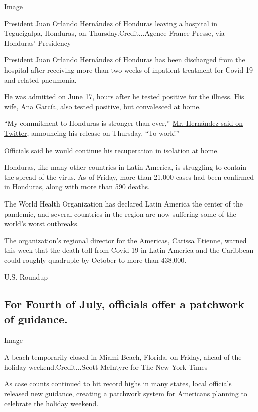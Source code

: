 Image

President Juan Orlando Hernández of Honduras leaving a hospital in
Tegucigalpa, Honduras, on Thursday.Credit...Agence France-Presse, via
Honduras' Presidency

President Juan Orlando Hernández of Honduras has been discharged from
the hospital after receiving more than two weeks of inpatient treatment
for Covid-19 and related pneumonia.

\href{https://www.nytimes3xbfgragh.onion/2020/06/17/world/americas/honduras-president-coronavirus.html}{He
was admitted} on June 17, hours after he tested positive for the
illness. His wife, Ana García, also tested positive, but convalesced at
home.

``My commitment to Honduras is stronger than ever,''
\href{https://twitter.com/JuanOrlandoH/status/1278695932478001154}{Mr.
Hernández said on Twitter}, announcing his release on Thursday. ``To
work!''

Officials said he would continue his recuperation in isolation at home.

Honduras, like many other countries in Latin America, is struggling to
contain the spread of the virus. As of Friday, more than 21,000 cases
had been confirmed in Honduras, along with more than 590 deaths.

The World Health Organization has declared Latin America the center of
the pandemic, and several countries in the region are now suffering some
of the world's worst outbreaks.

The organization's regional director for the Americas, Carissa Etienne,
warned this week that the death toll from Covid-19 in Latin America and
the Caribbean could roughly quadruple by October to more than 438,000.

U.S. Roundup

\hypertarget{for-fourth-of-july-officials-offer-a-patchwork-of-guidance}{%
\subsection{For Fourth of July, officials offer a patchwork of
guidance.}\label{for-fourth-of-july-officials-offer-a-patchwork-of-guidance}}

Image

A beach temporarily closed in Miami Beach, Florida, on Friday, ahead of
the holiday weekend.Credit...Scott McIntyre for The New York Times

As case counts continued to hit record highs in many states, local
officials released new guidance, creating a patchwork system for
Americans planning to celebrate the holiday weekend.

